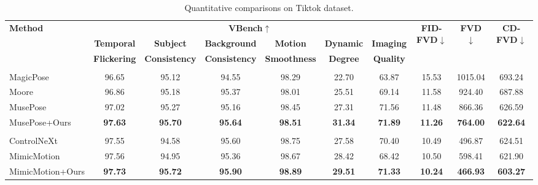 
\begin{table}[t]
\caption{Quantitative comparisons on Tiktok dataset.}
\vspace{5pt}
\label{tab: tiktok exp}
\scriptsize
\centering
\setlength{\tabcolsep}{1pt}
\begin{tabular}{lccccccccc}
\toprule
\multirow{3}{*}{\textbf{Method}} & \multicolumn{6}{c}{\textbf{VBench}$\uparrow$} & \multirow{3}{*}{\textbf{FID-FVD}$\downarrow$} & \multirow{3}{*}{\textbf{FVD}$\downarrow$} & \multirow{3}{*}{\textbf{CD-FVD}$\downarrow$} \\ \cmidrule{2-7}
                        & \textbf{Temporal}   & \textbf{Subject}      & \textbf{Background} & \textbf{Motion} & \textbf{Dynamic} & \textbf{Imaging} \\
                        & \textbf{Flickering}     & \textbf{Consistency}  & \textbf{Consistency} & \textbf{Smoothness} & \textbf{Degree} & \textbf{Quality} \\
\midrule
\multicolumn{9}{l}{\color{gray}{\emph{Stable Diffusion1.5}}}\\
MagicPose~\citep{chang2023magicpose} & 96.65 & 95.12 & 94.55 & 98.29 & 22.70 & 63.87 & 15.53 & 1015.04 & 693.24\\
Moore~\citep{moore-animateanyone}	& 96.86 & 95.18 & 95.37 & 98.01 & 25.51 & 69.14 & 11.58 & 924.40 & 687.88\\
MusePose~\citep{musepose} & 97.02 & 95.27 & 95.16 & 98.45 & 27.31 & 71.56 & 11.48 & 866.36 & 626.59\\
\rowcolor{aliceblue!60}
MusePose+Ours	& \textbf{97.63} & \textbf{95.70} & \textbf{95.64} & \textbf{98.51} & \textbf{31.34} & \textbf{71.89} & \textbf{11.26} & \textbf{764.00} &\textbf{622.64}\\
\midrule
\multicolumn{9}{l}{\color{gray}{\emph{Stable Video Diffusion}}}\\
ControlNeXt~\citep{peng2024controlnext}	& 97.55 & 94.58 & 95.60 & 98.75 & 27.58 & 70.40 & 10.49 & 496.87&624.51 \\
MimicMotion~\citep{zhang2024mimicmotion}	& 97.56 & 94.95 & 95.36 & 98.67 & 28.42 & 68.42 & 10.50 & 598.41&621.90 \\
\rowcolor{aliceblue!60}
MimicMotion+Ours & \textbf{97.73} & \textbf{95.72} & \textbf{95.90} & \textbf{98.89} & \textbf{29.51} & \textbf{71.33} & \textbf{10.24} & \textbf{466.93} &\textbf{603.27}\\
\bottomrule
\end{tabular}
\vspace{-5pt}
\end{table}



